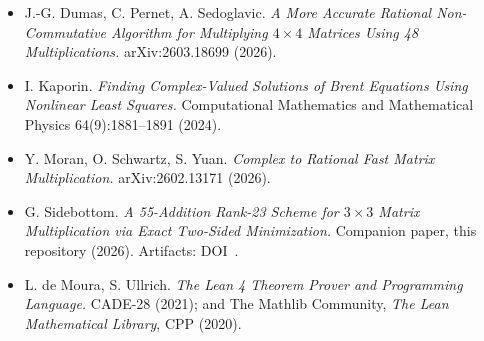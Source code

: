 \documentclass[10pt]{article}
\begin{document}
\begin{itemize}
  PLinOpt repository ().
\item J.-G. Dumas, C. Pernet, A. Sedoglavic. \emph{A More Accurate
  Rational Non-Commutative Algorithm for Multiplying $4\times4$
  Matrices Using 48 Multiplications.} arXiv:2603.18699 (2026).
\item I. Kaporin. \emph{Finding Complex-Valued Solutions of Brent
  Equations Using Nonlinear Least Squares.} Computational Mathematics
  and Mathematical Physics 64(9):1881--1891 (2024).
\item Y. Moran, O. Schwartz, S. Yuan. \emph{Complex to Rational Fast
  Matrix Multiplication.} arXiv:2602.13171 (2026).
\item G. Sidebottom. \emph{A 55-Addition Rank-23 Scheme for
  $3\times3$ Matrix Multiplication via Exact Two-Sided Minimization.}
  Companion paper, this repository (2026). Artifacts:
  DOI~.
\item L. de Moura, S. Ullrich. \emph{The Lean 4 Theorem Prover and
  Programming Language.} CADE-28 (2021); and The Mathlib Community,
  \emph{The Lean Mathematical Library}, CPP (2020).
\end{itemize}
\end{document}

